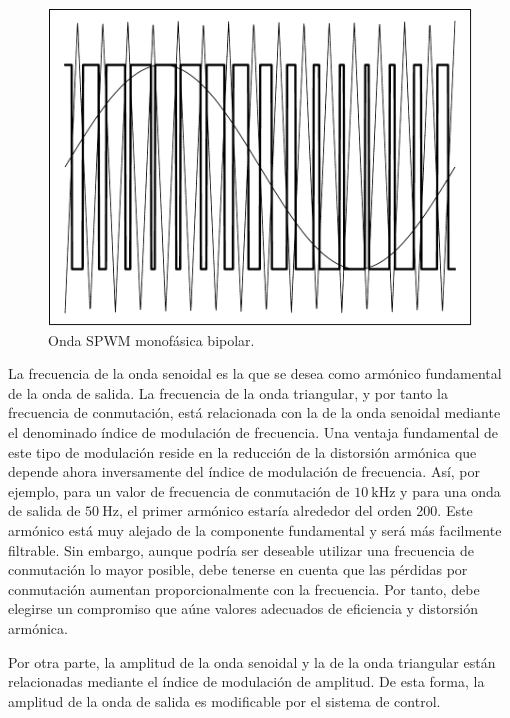 %
\begin{figure}
\includegraphics[scale=0.6]{../figs/SPWMMonofasico}

\caption{\label{fig:Onda-SPWM-monofasica}Onda SPWM monofásica bipolar.}

\end{figure}


La frecuencia de la onda senoidal es la que se desea como armónico
fundamental de la onda de salida. La frecuencia de la onda triangular,
y por tanto la frecuencia de conmutación, está relacionada con la
de la onda senoidal mediante el denominado índice de modulación de
frecuencia. Una ventaja fundamental de este tipo de modulación reside
en la reducción de la distorsión armónica que depende ahora inversamente
del índice de modulación de frecuencia. Así, por ejemplo, para un
valor de frecuencia de conmutación de $\SI{10}{\kHz}$ y para una
onda de salida de $\SI{50}{\Hz}$, el primer armónico estaría alrededor
del orden 200. Este armónico está muy alejado de la componente fundamental
y será más facilmente filtrable. Sin embargo, aunque podría ser deseable
utilizar una frecuencia de conmutación lo mayor posible, debe tenerse
en cuenta que las pérdidas por conmutación aumentan proporcionalmente
con la frecuencia. Por tanto, debe elegirse un compromiso que aúne
valores adecuados de eficiencia y distorsión armónica. 

Por otra parte, la amplitud de la onda senoidal y la de la onda triangular
están relacionadas mediante el índice de modulación de amplitud. De
esta forma, la amplitud de la onda de salida es modificable por el
sistema de control.

